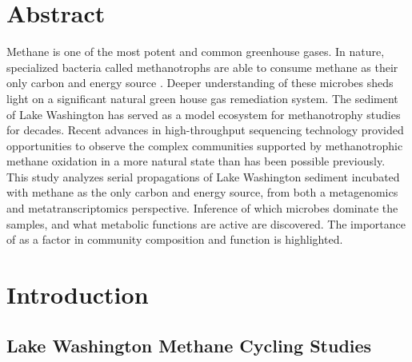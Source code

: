 
\section{Abstract}

Methane is one of the most potent and common greenhouse gases.
In nature, specialized bacteria called methanotrophs are able to consume methane as their only carbon and energy source \cite{murrell2009}.
Deeper understanding of these microbes sheds light on a significant natural green house gas remediation system.
The sediment of Lake Washington has served as a model ecosystem for methanotrophy studies \cite{auman2002, kalyuzhnaya2004, costello2002, kalyuzhnaya2011isolates, mctaggart2015, kalyuzhnaya2015} for decades.
Recent advances in high-throughput sequencing technology provided opportunities to observe the complex communities supported by methanotrophic methane oxidation in a more natural state than has been possible previously.
This study analyzes serial propagations of Lake Washington sediment incubated with methane as the only carbon and energy source, from both a metagenomics and metatranscriptomics perspective.
Inference of which microbes dominate the samples, and what metabolic functions are active are discovered.
The importance of  as a factor in community composition and function is highlighted.

\section{Introduction}
\subsection{Lake Washington Methane Cycling Studies}

